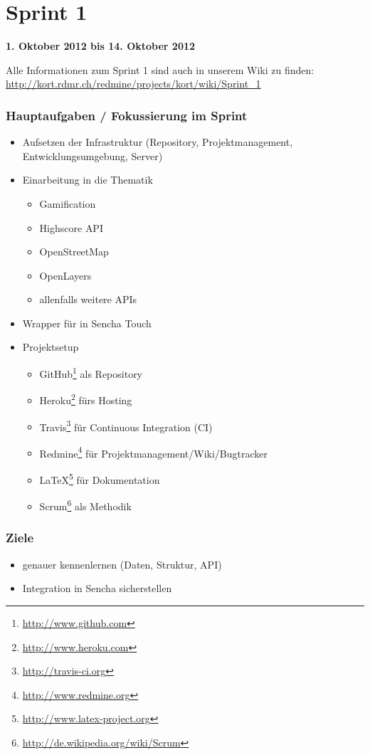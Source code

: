 \cleardoublepage
\section{Sprint 1}

\textbf{1. Oktober 2012 bis 14. Oktober 2012}

Alle Informationen zum Sprint 1 sind auch in unserem Wiki zu finden:
\url{http://kort.rdmr.ch/redmine/projects/kort/wiki/Sprint_1}

\subsubsection{Hauptaufgaben / Fokussierung im Sprint}

\begin{itemize}
	\item Aufsetzen der Infrastruktur (Repository, Projektmanagement, Entwicklungsumgebung, Server)
	\item Einarbeitung in die Thematik
	\begin{itemize}
		\item \gls{Gamification}
		\item Highscore \gls{API}
		\item OpenStreetMap
		\item OpenLayers
		\item allenfalls weitere \glspl{API}
	\end{itemize}
	\item Wrapper für  in Sencha Touch
	\item Projektsetup
	\begin{itemize}
		\item GitHub\footnote{\url{http://www.github.com}} als Repository
		\item Heroku\footnote{\url{http://www.heroku.com}} fürs Hosting
		\item Travis\footnote{\url{http://travis-ci.org}} für Continuous Integration (CI)
		\item Redmine\footnote{\url{http://www.redmine.org}} für Projektmanagement/Wiki/Bugtracker
		\item \LaTeX{}\footnote{\url{http://www.latex-project.org}} für Dokumentation
		\item Scrum\footnote{\url{http://de.wikipedia.org/wiki/Scrum}} als Methodik
	\end{itemize}
\end{itemize}

\subsubsection{Ziele}
\begin{itemize}
	\item {} genauer kennenlernen (Daten, Struktur, \gls{API})
	\item Integration in Sencha sicherstellen
\end{itemize}

